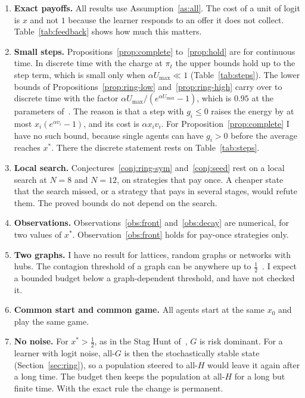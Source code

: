 \documentclass[11pt,a4paper]{article}
\theoremstyle{definition}
\theoremstyle{plain}
\newcommand{\xs}{x^{*}}
\begin{document}
\begin{enumerate}
\item \textbf{Exact payoffs.} All results use Assumption~\ref{as:all}. The cost of a unit of logit is $x$ and not $1$ because the learner responds to an offer it does not collect. Table~\ref{tab:feedback} shows how much this matters.
\item \textbf{Small steps.} Propositions~\ref{prop:complete} to~\ref{prop:hold} are for continuous time. In discrete time with the charge at $\pi_t$ the upper bounds hold up to the step term, which is small only when $\alpha U_{\max}\ll1$ (Table~\ref{tab:steps}). The lower bounds of Propositions~\ref{prop:ring-low} and~\ref{prop:ring-high} carry over to discrete time with the factor $\alpha U_{\max}/(e^{\alpha U_{\max}}-1)$, which is $0.95$ at the parameters of~\cite{huang2025}. The reason is that a step with $g_i\le0$ raises the energy by at most $x_i(e^{\alpha v_i}-1)$, and its cost is $\alpha x_iv_i$. For Proposition~\ref{prop:complete} I have no such bound, because single agents can have $g_i>0$ before the average reaches $\xs$. There the discrete statement rests on Table~\ref{tab:steps}.
\item \textbf{Local search.} Conjectures~\ref{conj:ring-sym} and~\ref{conj:seed} rest on a local search at $N=8$ and $N=12$, on strategies that pay once. A cheaper state that the search missed, or a strategy that pays in several stages, would refute them. The proved bounds do not depend on the search.
\item \textbf{Observations.} Observations~\ref{obs:front} and~\ref{obs:decay} are numerical, for two values of $\xs$. Observation~\ref{obs:front} holds for pay-once strategies only.
\item \textbf{Two graphs.} I have no result for lattices, random graphs or networks with hubs. The contagion threshold of a graph can be anywhere up to $\tfrac12$~\cite{morris2000}. I expect a bounded budget below a graph-dependent threshold, and have not checked it.
\item \textbf{Common start and common game.} All agents start at the same $x_0$ and play the same game.
\item \textbf{No noise.} For $\xs>\tfrac12$, as in the Stag Hunt of~\cite{huang2025}, $G$ is risk dominant. For a learner with logit noise, all-$G$ is then the stochastically stable state (Section~\ref{sec:ring}), so a population steered to all-$H$ would leave it again after a long time. The budget then keeps the population at all-$H$ for a long but finite time. With the exact rule the change is permanent.

\end{enumerate}
\end{document}
